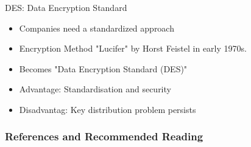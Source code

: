 \documentclass[]{beamer}
\begin{document}
\begin{frame}{DES: Data Encryption Standard}
	\begin{itemize}
		\item<1-> Companies need a standardized approach
		\item<2-> Encryption Method "Lucifer" by Horst Feistel in early 1970s.
		\item<3-> Becomes "Data Encryption Standard (DES)"
		\item<4-> Advantage: Standardisation and security
		\item<5-> Disadvantag: Key distribution problem persists
	\end{itemize}
\end{frame}

\begin{frame}%
\frametitle{References and Recommended Reading}
	
	
\end{frame}
\end{document}
